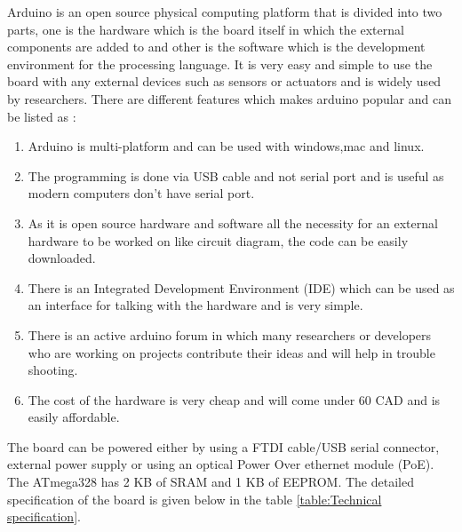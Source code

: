 Arduino is an open source physical computing platform that is divided into two parts, one is the hardware which is the board itself in which the external components are added to and other is the software which is the development environment for the  processing language. It is very easy and simple to use the board with any external devices such as sensors or actuators and is widely used by researchers. There are different features which makes arduino popular and can be listed as \cite{Banzi2008}:


\begin{enumerate}


  \item Arduino is multi-platform and can be used with windows,mac and linux.

  \item The programming is done via USB cable and not serial port and is useful as modern computers don't have serial port.

  \item As it is open source hardware and software all the necessity for an external hardware to be worked on like circuit diagram, the code can be easily downloaded.
  
  \item There is an Integrated Development Environment (IDE) which can be used as an interface for talking with the hardware and is very simple.
  
  \item There is an active arduino forum in which many researchers or developers who are working on projects contribute their ideas and will help in trouble shooting.
  
  \item The cost of the hardware is very cheap and will come under 60 CAD and is easily affordable.
  
\end{enumerate}

The board can be powered either by using a FTDI cable/USB serial connector, external power supply or using an optical Power Over ethernet module (PoE). The ATmega328 has 2 KB of SRAM and 1 KB of EEPROM. The detailed specification\cite{Guti2017} of the board is given below in the table \ref{table:Technical specification}.
 
